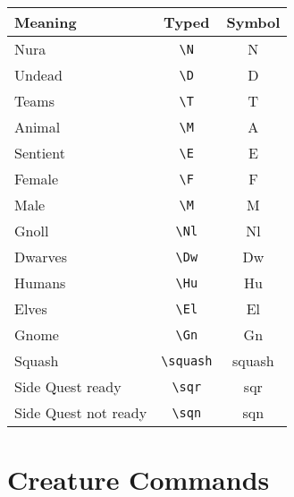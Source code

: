 \documentclass[a4paper,openany]{book}
\begin{document}
\begin{multicols}{2}
\begin{tabularx}{\linewidth}{Xcc}

  Meaning & Typed & Symbol \\\hline

  Nura & {\tt \textbackslash{N}} & \gls{N} \\

  Undead & {\tt \textbackslash{D}} & \gls{D} \\
  \hline
  Teams & {\tt \textbackslash{T}} & \gls{T} \\

  Animal & {\tt \textbackslash{M}} & \gls{A} \\

  Sentient & {\tt \textbackslash{E}} & \gls{E} \\

  Female & {\tt \textbackslash{F}} & \gls{F} \\

  Male & {\tt \textbackslash{M}} & \gls{M} \\

  \hline
  Gnoll & {\tt \textbackslash{Nl}} & \gls{Nl} \\

  Dwarves & {\tt \textbackslash{Dw}} & \gls{Dw} \\

  Humans & {\tt \textbackslash{Hu}} & \gls{Hu} \\

  Elves & {\tt \textbackslash{El}} & \gls{El} \\

  Gnome & {\tt \textbackslash{Gn}} & \gls{Gn} \\
  \hline
  Squash & {\tt \textbackslash{squash}} & \gls{squash} \\

  Side Quest ready & {\tt \textbackslash{sqr}} & \gls{sqr} \\

  Side Quest not ready & {\tt \textbackslash{sqn}} & \gls{sqn} \\

\end{tabularx}

\end{multicols}

\section{Creature Commands}
\end{document}
